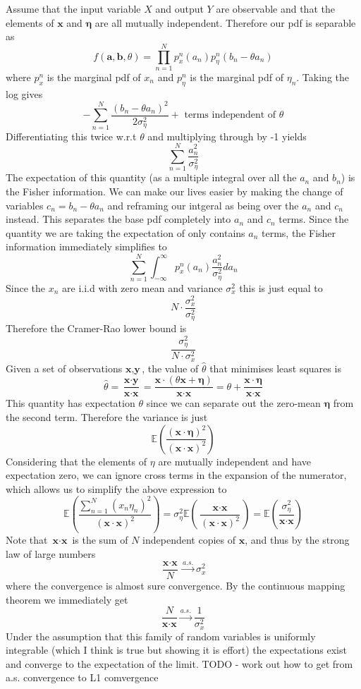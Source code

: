 \documentclass{article}
\newcommand{\chapternumber}{3}
\newenvironment{QandA}{\begin{enumerate}[label=\chapternumber.\arabic*]\bfseries\boldmath}
	{\end{enumerate}}
\newenvironment{answered}{\par\bigskip\normalfont\unboldmath}{}
\begin{document}
\begin{QandA}
		\begin{answered}
			Assume that the input variable $X$ and output $Y$ are observable and that the elements of $\textbf{x}$ and $\boldsymbol{\eta}$ are all mutually independent. Therefore our pdf is separable as
			\[f(\textbf{a},\textbf{b},\theta)=\prod_{n=1}^{N}p_x^n(a_n)p_\eta^n(b_n-\theta a_n)\]
			where $p_x^n$ is the marginal pdf of $x_n$ and $p_\eta^n$ is the marginal pdf of $\eta_n$.
			Taking the log gives
			\[-\sum_{n=1}^{N} \frac{(b_n-\theta a_n)^2}{2\sigma_\eta^2} + \text{ terms independent of }\theta\]
			Differentiating this twice w.r.t $\theta$ and multiplying through by -1 yields
			\[\sum_{n=1}^{N}\frac{a_n^2}{\sigma_\eta^2}\]
			The expectation of this quantity (as a multiple integral over all the $a_n$ and $b_n$) is the Fisher information. We can make our lives easier by making the change of variables $c_n = b_n-\theta a_n$ and reframing our intgeral as being over the $a_n$ and $c_n$ instead. This separates the base pdf completely into $a_n$ and $c_n$ terms. Since the quantity we are taking the expectation of only contains $a_n$ terms, the Fisher information immediately simplifies to 
			\[\sum_{n=1}^{N}\int_{-\infty}^{\infty}p_x^n(a_n)\frac{a_n^2}{\sigma_\eta^2}da_n\]
			Since the $x_n$ are i.i.d with zero mean and variance $\sigma_x^2$
			this is just equal to 
			\[N\cdot\frac{\sigma_x^2}{\sigma_\eta^2}\]
			Therefore the Cramer-Rao lower bound is 
			\[\frac{\sigma_\eta^2}{N\cdot\sigma_x^2}\]
			Given a set of observations $\textbf{x},\textbf{y}$, the value of $\hat\theta$ that minimises least squares is
			\[\hat\theta = \frac{\textbf{x}\cdot\textbf{y}}{\textbf{x}\cdot\textbf{x}} = \frac{\textbf{x}\cdot(\theta \textbf{x} + \boldsymbol{\eta})}{\textbf{x}\cdot\textbf{x}} = \theta + \frac{\textbf{x}\cdot\boldsymbol{\eta}}{\textbf{x}\cdot\textbf{x}}\]
			This quantity has expectation $\theta$ since we can separate out the zero-mean $\boldsymbol{\eta}$ from the second term. Therefore the variance is just
			\[\mathbb{E}\left(\frac{(\textbf{x}\cdot\boldsymbol{\eta})^2}{(\textbf{x}\cdot\textbf{x})^2}\right)\]
			Considering that the elements of $\eta$ are mutually independent and have expectation zero, we can ignore cross terms in the expansion of the numerator, which allows us to simplify the above expression to
			\[\mathbb{E}\left(\frac{\sum_{n=1}^{N}(x_n\eta_n)^2}{(\textbf{x}\cdot\textbf{x})^2}\right)=\sigma_\eta^2\mathbb{E}\left(\frac{\textbf{x}\cdot\textbf{x}}{(\textbf{x}\cdot\textbf{x})^2}\right)=\mathbb{E}\left(\frac{\sigma_\eta^2}{\textbf{x}\cdot\textbf{x}}\right)\]
			Note that $\textbf{x}\cdot\textbf{x}$ is the sum of $N$ independent copies of $\textbf{x}$, and thus by the strong law of large numbers
			\[\frac{\textbf{x}\cdot\textbf{x}}{N}\xrightarrow{a.s.}\sigma_x^2\]
			where the convergence is almost sure convergence.
			By the continuous mapping theorem we immediately get \[\frac{N}{\textbf{x}\cdot\textbf{x}}\xrightarrow{a.s.}\frac{1}{\sigma_x^2}\]
			Under the assumption that this family of random variables is uniformly integrable (which I think is true but showing it is effort) the expectations exist and converge to the expectation of the limit.
			TODO - work out how to get from a.s. convergence to L1 comvergence
		\end{answered}
	

\end{QandA}
\end{document}
